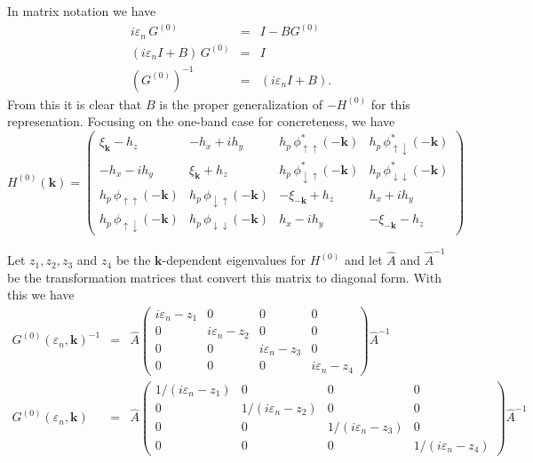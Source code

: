 In matrix notation we have
\begin{eqnarray}
i\varepsilon_n\, G^{(0)} & = & I - B   G^{(0)} \\
(i\varepsilon_n I + B)\,G^{(0)} & = & I \\
(G^{(0)})^{-1} & = & (i\varepsilon_n I + B).
\end{eqnarray}
From this it is clear that $B$ is the proper generalization
of $-H^{(0)}$ for this represenation.
Focusing on the one-band case for concreteness, we have
\begin{equation}
H^{(0)}(\mathbf{k}) =
\begin{pmatrix}
\xi_{\mathbf{k}} - h_z &
- h_x + i h_y &
h_p\, \phi^*_{\uparrow\uparrow}(-\mathbf{k}) &
h_p\, \phi^*_{\uparrow\downarrow}(-\mathbf{k}) \\
- h_x - i h_y &
\xi_{\mathbf{k}} + h_z &
h_p\, \phi^*_{\downarrow\uparrow}(-\mathbf{k}) &
h_p\, \phi^*_{\downarrow\downarrow}(-\mathbf{k}) \\ 
h_p\, \phi_{\uparrow\uparrow}(-\mathbf{k}) &
h_p\, \phi_{\downarrow\uparrow}(-\mathbf{k}) &
- \xi_{-\mathbf{k}} + h_z &
h_x + ih_y \\
h_p\, \phi_{\uparrow\downarrow}(-\mathbf{k}) &
h_p\, \phi_{\downarrow\downarrow}(-\mathbf{k}) & 
h_x - ih_y &
- \xi_{-\mathbf{k}} - h_z 
\end{pmatrix}
\end{equation}

Let $z_1, z_2, z_3$ and $z_4$ be the
$\mathbf{k}$-dependent eigenvalues
for $H^{(0)}$ and let
$\hat{A}$ and $\hat{A}^{-1}$ be the
transformation matrices that convert this
matrix to diagonal form.  With this we have
\begin{eqnarray}
G^{(0)}(\varepsilon_n,\mathbf{k})^{-1} & = & 
\hat{A}
\begin{pmatrix}
i\varepsilon_n - z_1 & 0 & 0 & 0 \\
0 & i\varepsilon_n - z_2 & 0 & 0 \\
0 & 0 & i\varepsilon_n - z_3 & 0 \\
0 & 0 & 0 & i\varepsilon_n - z_4
\end{pmatrix}
\hat{A}^{-1} \\
G^{(0)}(\varepsilon_n,\mathbf{k}) & = & 
\hat{A} 
\begin{pmatrix}
1/ (i\varepsilon_n - z_1) & 0 & 0 & 0 \\
0 & 1/(i\varepsilon_n - z_2) & 0 & 0 \\
0 & 0 & 1/(i\varepsilon_n - z_3) & 0 \\
0 & 0 & 0 & 1/(i\varepsilon_n - z_4)
\end{pmatrix}
\hat{A}^{-1}
\end{eqnarray} 

